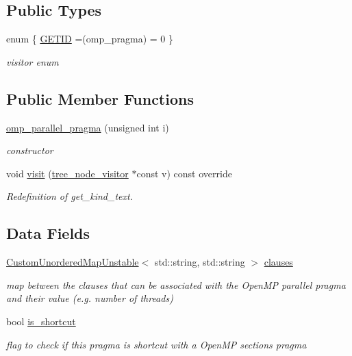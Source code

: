 \subsection*{Public Types}
\begin{DoxyCompactItemize}
\item 
enum \{ \hyperlink{structomp__parallel__pragma_a5fc55c671a3ff207948c6eeb3403d05cad56907e23fbfa7587f3a237efc615d42}{G\+E\+T\+ID} =(omp\+\_\+pragma) = 0
 \}\begin{DoxyCompactList}\small\item\em visitor enum \end{DoxyCompactList}
\end{DoxyCompactItemize}
\subsection*{Public Member Functions}
\begin{DoxyCompactItemize}
\item 
\hyperlink{structomp__parallel__pragma_a48290ef1b23c267b3586e9f8bf2a8f85}{omp\+\_\+parallel\+\_\+pragma} (unsigned int i)
\begin{DoxyCompactList}\small\item\em constructor \end{DoxyCompactList}\item 
void \hyperlink{structomp__parallel__pragma_ac501a81fc5120b8ce8ec7c75fb617b57}{visit} (\hyperlink{classtree__node__visitor}{tree\+\_\+node\+\_\+visitor} $\ast$const v) const override
\begin{DoxyCompactList}\small\item\em Redefinition of get\+\_\+kind\+\_\+text. \end{DoxyCompactList}\end{DoxyCompactItemize}
\subsection*{Data Fields}
\begin{DoxyCompactItemize}
\item 
\hyperlink{custom__map_8hpp_a8cbaceffc09790a885ec7e9c17809c69}{Custom\+Unordered\+Map\+Unstable}$<$ std\+::string, std\+::string $>$ \hyperlink{structomp__parallel__pragma_a4befddd57ba7cd852517221c4695720c}{clauses}
\begin{DoxyCompactList}\small\item\em map between the clauses that can be associated with the Open\+MP parallel pragma and their value (e.\+g. number of threads) \end{DoxyCompactList}\item 
bool \hyperlink{structomp__parallel__pragma_ab94eeb452812ad9c48259fa3ecd5a6fa}{is\+\_\+shortcut}
\begin{DoxyCompactList}\small\item\em flag to check if this pragma is shortcut with a Open\+MP sections pragma \end{DoxyCompactList}\end{DoxyCompactItemize}
